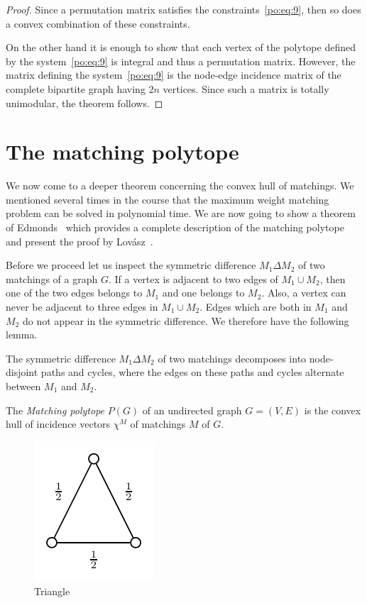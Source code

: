 \begin{proof}
  Since a permutation matrix satisfies the constraints~\eqref{po:eq:9},
  then so does a convex combination of these constraints. 


  On the other hand it is enough to show that each vertex of the
  polytope defined by the system~\eqref{po:eq:9} is integral and thus a
  permutation matrix. However, the matrix defining the
  system~\eqref{po:eq:9}  is the node-edge incidence matrix of the
  complete bipartite graph having $2n$ vertices. Since such a matrix
  is totally unimodular, the theorem follows. 
\end{proof}





\section{The matching polytope}
\label{po:sec:matching-polytope}


We now come to a deeper theorem concerning the convex hull of
matchings. We mentioned several times in the course that the maximum
weight matching problem can be solved in polynomial time. We are now
going to show a theorem of Edmonds~\cite{Edmonds65b} which provides a
complete description of the matching polytope and present the
proof by Lov\'asz~\cite{Lovasz79}. 

Before we proceed let us inspect the symmetric difference $M_1\Delta M_2$
of two matchings of a graph $G$. If a vertex is adjacent to two edges
of $M_1\cup M_2$, then one of the two edges belongs to
$M_1$ and one belongs to $M_2$. Also, a vertex can never be adjacent
to three edges in $M_1 \cup M_2$. Edges which are both in $M_1$ and $M_2$
do not appear in the symmetric difference. We therefore have the
following lemma. 

\begin{lemma}
  \label{pox:lem:11}
  The symmetric difference $M_1\Delta M_2$ of two matchings decomposes
  into node-disjoint  paths and cycles, where the edges on these paths
  and cycles alternate between $M_1$ and $M_2$. 
\end{lemma}



The \emph{Matching polytope} $P(G)$ of an undirected graph $G = (V,E)$
is the convex hull of incidence vectors  $\chi^M$ of matchings $M$ of
$G$. 


  
\begin{figure}[htbp]
  \centering 
   \includegraphics{figures/IntProg3.pdf}
  \caption{Triangle}
  \label{po:fig:triangle}
\end{figure}
  

